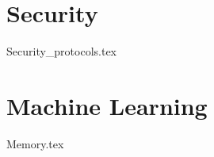 \documentclass[11pt]{book}
\begin{document}
\part{Security}
{Security_protocols.tex}

\part{Machine Learning}
{Memory.tex}


%

\backmatter 
%
%
% 
\printindex %
\end{document}
